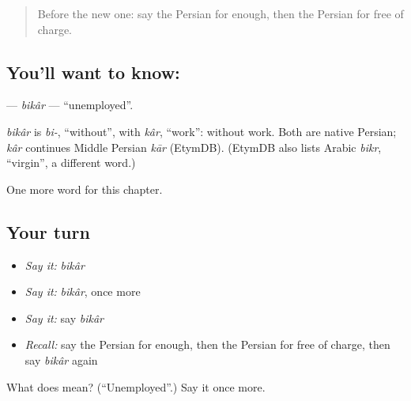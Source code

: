 \label{lesson:FA-C235-bikar}



\begin{quote}
Before the new one: say the Persian for enough, then the Persian for free of charge.
\end{quote}

\subsection*{You'll want to know: }
\textbf{} — \emph{bikâr} — \textquotedblleft{}unemployed\textquotedblright{}.

\begin{cousinweb}
\emph{bikâr} is \emph{bi-}, \textquotedblleft{}without\textquotedblright{}, with \emph{kâr}, \textquotedblleft{}work\textquotedblright{}: without work. Both are native Persian; \emph{kâr} continues Middle Persian \emph{kār} (EtymDB). (EtymDB also lists Arabic \emph{bikr}, \textquotedblleft{}virgin\textquotedblright{}, a different word.)
\end{cousinweb}

\begin{grammarlens}[title={What you've built}]
One more word for this chapter.
\end{grammarlens}

\subsection*{Your turn}
\begin{itemize}
\raggedright
  \item \emph{Say it:} \emph{bikâr}
  \item \emph{Say it:} \emph{bikâr}, once more
  \item \emph{Say it:} say \emph{bikâr}
  \item \emph{Recall:} say the Persian for enough, then the Persian for free of charge, then say \emph{bikâr} again
\end{itemize}

\begin{tcolorbox}[breakable,colback=teal!4,colframe=teal!35!black,title={Before you move on}]
What does  mean? (\textquotedblleft{}Unemployed\textquotedblright{}.) Say it once more.
\end{tcolorbox}
